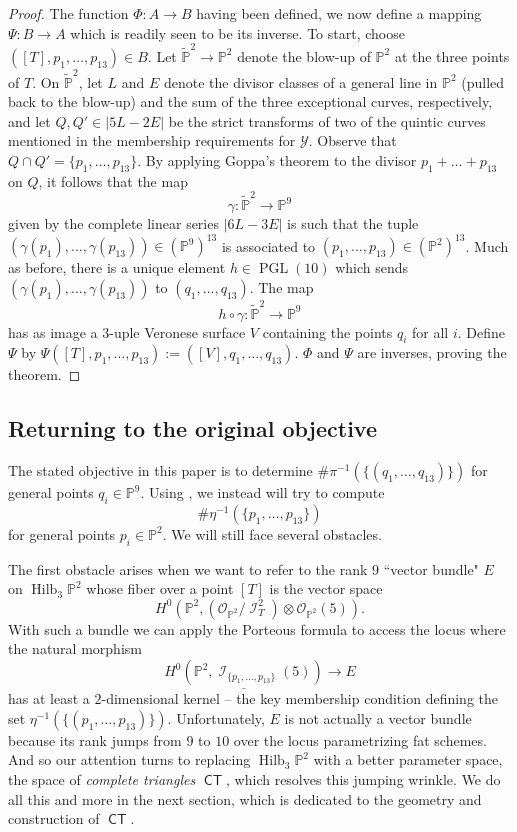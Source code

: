 \documentclass{article}
\renewcommand{\P}{\mathbb{P}}
\DeclareMathOperator{\PGL}{PGL}
\DeclareMathOperator{\Hilb}{Hilb}
\DeclareMathOperator{\I}{\mathcal{I}}
\renewcommand{\O}{\mathcal{O}}
\DeclareMathOperator{\CT}{\mathsf{CT}}
\begin{document}
\begin{proof}
    The function $\Phi: A \to B$ having been defined, we now define a mapping $\Psi: B \to A$ which is readily seen to be its inverse.  To start, choose $([T],p_{1}, \dots, p_{13}) \in B$. Let $\widetilde{\P}^{2} \to \P^{2}$ denote the blow-up of $\P^{2}$ at the three points of $T$.  On $\widetilde{\P}^{2}$, let $L$ and $E$ denote the divisor classes of a general line in $\P^{2}$ (pulled back to the blow-up) and the sum of the three exceptional curves, respectively, and let $Q,Q' \in |5L-2E|$ be the strict transforms of two of the quintic curves mentioned in the membership requirements for $\mathcal{Y}$.  Observe that $Q\cap Q' = \{p_{1}, \dots, p_{13}\}$. By applying Goppa's theorem to the divisor $p_{1}+ \dots + p_{13}$ on $Q$, it follows that the map $$\gamma: \widetilde{\P}^{2} \to \P^{9}$$ given by the complete linear series $|6L-3E|$ is such that the tuple $(\gamma(p_{1}), \dots, \gamma(p_{13})) \in (\P^{9})^{13}$ is associated to $(p_{1}, \dots, p_{13}) \in (\P^{2})^{13}$.  Much as before, there is a unique element $h \in \PGL(10)$ which sends $(\gamma(p_{1}), \dots, \gamma(p_{13}))$ to $(q_{1}, \dots, q_{13})$. The map $$h \circ \gamma: \widetilde{\P}^{2} \to \P^{9}$$ has as image a $3$-uple Veronese surface $V$ containing the points $q_{i}$ for all $i$. Define $\Psi$ by $\Psi([T],p_{1},\dots, p_{13}) := ([V],q_{1}, \dots, q_{13}).$   $\Phi$ and $\Psi$ are inverses, proving the theorem.
\end{proof}

\subsection{Returning to the original objective}
\label{subsec:returning}
The stated objective in this paper is to determine $\#\pi^{-1}(\{(q_{1}, \dots, q_{13})\})$ for general points $q_{i} \in \P^{9}$.  Using , we instead will try to compute $$\#\eta^{-1}(\{p_{1}, \dots, p_{13}\})$$ for general points $p_{i} \in \P^{2}$.  We will still face several obstacles.

The first obstacle arises when we want to refer to the rank $9$ ``vector bundle" $E$ on $\Hilb_{3}\P^{2}$ whose fiber over a point $[T]$ is the vector space $$H^{0}\left(\P^{2}, \left(\O_{\P^{2}}/ \I_{T}^{2}\right)\otimes \O_{\P^{2}}(5)\right).$$  With such a bundle we can apply the Porteous formula to access the locus where the natural morphism $$\underline{H^{0}\left(\P^{2},\I_{\{p_{1}, \dots, p_{13}\}}(5)\right)} \to E$$ has at least a $2$-dimensional kernel -- the key membership condition defining the set $\eta^{-1}(\{(p_{1}, \dots, p_{13})\})$. Unfortunately, $E$ is not actually a vector bundle because its rank jumps from $9$ to $10$ over the locus parametrizing fat schemes.  And so our attention turns to replacing $\Hilb_{3}\P^{2}$ with a better parameter space, the space of {\sl complete triangles} $\CT$, which resolves this jumping wrinkle.  We do all this and more in the next section, which is dedicated to the geometry and construction of $\CT$.
\end{document}
